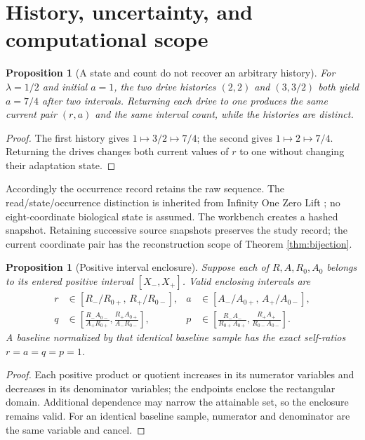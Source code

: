 \documentclass[11pt]{article}
\newtheorem{proposition}[theorem]{Proposition}
\begin{document}
\section{History, uncertainty, and computational scope}

\begin{proposition}[A state and count do not recover an arbitrary history]
\label{prop:collision}
For \(\lambda=1/2\) and initial \(a=1\), the two drive histories
\((2,2)\) and \((3,3/2)\) both yield \(a=7/4\) after two intervals.
Returning each drive to one produces the same current pair \((r,a)\)
and the same interval count, while the histories are distinct.
\end{proposition}
\begin{proof}
The first history gives \(1\mapsto3/2\mapsto7/4\); the second gives
\(1\mapsto2\mapsto7/4\). Returning the drives changes both current
values of \(r\) to one without changing their adaptation state.
\end{proof}
Accordingly the occurrence record retains the raw sequence. The
read/state/occurrence distinction is inherited from Infinity One Zero
Lift \cite{iozl}; no eight-coordinate biological state is assumed.
The workbench creates a hashed snapshot. Retaining successive source
snapshots preserves the study record; the current coordinate pair
has the reconstruction scope of Theorem \ref{thm:bijection}.

\begin{proposition}[Positive interval enclosure]\label{prop:interval}
Suppose each of \(R,A,R_0,A_0\) belongs to its entered positive interval
\([X_-,X_+]\). Valid enclosing intervals are
\begin{align}
 r&\in[R_-/R_{0+},\,R_+/R_{0-}],&
 a&\in[A_-/A_{0+},\,A_+/A_{0-}],\label{eq:ra-bounds}\\
 q&\in\left[\frac{R_-A_{0-}}{A_+R_{0+}},
             \frac{R_+A_{0+}}{A_-R_{0-}}\right],&
 p&\in\left[\frac{R_-A_-}{R_{0+}A_{0+}},
             \frac{R_+A_+}{R_{0-}A_{0-}}\right].\label{eq:qp-bounds}
\end{align}
A baseline normalized by that identical baseline sample has the exact
self-ratios \(r=a=q=p=1\).
\end{proposition}
\begin{proof}
Each positive product or quotient increases in its numerator variables
and decreases in its denominator variables; the endpoints enclose the
rectangular domain. Additional dependence may narrow the attainable
set, so the enclosure remains valid. For an identical baseline sample,
numerator and denominator are the same variable and cancel.
\end{proof}
\end{document}
